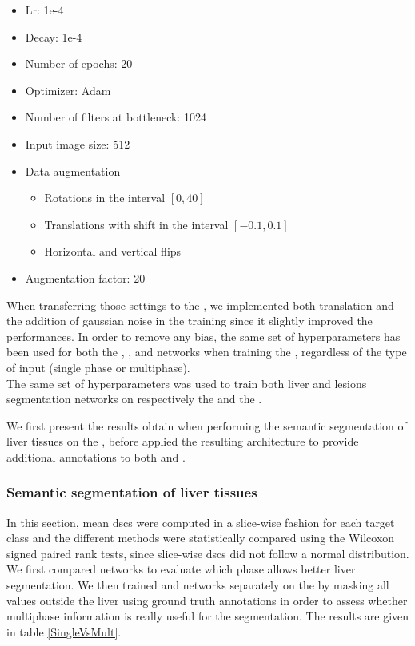 \begin{itemize}
	\item Lr: 1e-4
	\item Decay: 1e-4
	\item Number of epochs: 20
	\item Optimizer: Adam
	\item Number of filters at bottleneck: 1024
	\item Input image size: 512
	\item Data augmentation
	\begin{itemize}
		\item Rotations in the interval $ \left[0, 40\right] $
		\item Translations with shift in the interval $ \left[-0.1, 0.1\right] $
		\item Horizontal and vertical flips
	\end{itemize}
	\item Augmentation factor: 20
\end{itemize}

When transferring those settings to the \textbf{}, 
we implemented both translation and the addition of gaussian
noise in the training since it slightly improved the performances.
In order to remove any bias, the same set of hyperparameters has been
used for both the , ,  and
 networks when training the \textbf{}, regardless of the
type of input (single phase or multiphase). \\
The same set of hyperparameters was used to train both liver and lesions segmentation networks on respectively the \textbf{} and the \textbf{}.

We first present the results obtain when performing the semantic segmentation of liver tissues on the \textbf{}, before applied the resulting architecture to provide additional annotations to both \textbf{} and \textbf{}.


\subsubsection{Semantic segmentation of liver tissues}

In this section, mean \ac{dsc}s were computed in a slice-wise fashion for each target class and the different methods were statistically compared using the Wilcoxon 
signed paired rank tests, since slice-wise \ac{dsc}s did not follow a normal distribution. 
We first compared  networks
 to evaluate which phase allows better liver segmentation. 
 We then trained  and   networks separately on the \textbf{} by masking all values outside the liver using ground truth annotations in order to assess whether multiphase information is really useful for the segmentation. The results are given in table \ref{SingleVsMult}.

